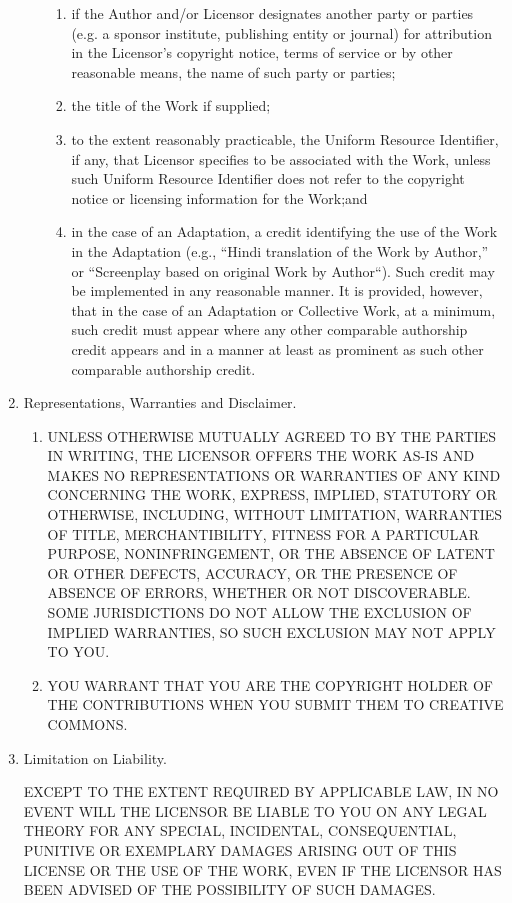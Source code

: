 \begin{enumerate}
\begin{enumerate}
\begin{enumerate}
	      \item{if the Author and/or Licensor designates another party or parties (e.g. a sponsor institute, publishing entity or journal) for attribution in the Licensor's copyright notice, terms of service or by other reasonable means, the name of such party or parties;}
	      \item{the title of the Work if supplied;}
	      \item{to the extent reasonably practicable, the Uniform Resource Identifier, if any, that Licensor specifies to be associated with the Work, unless such Uniform Resource Identifier does not refer to the copyright notice or licensing information for the Work;and}
	      \item{in the case of an Adaptation, a credit identifying the use of the Work in the Adaptation (e.g., ``Hindi translation of the Work by Author,'' or ``Screenplay based on original Work by Author``). Such credit may be implemented in any reasonable manner. It is provided, however, that in the case of an Adaptation or Collective Work, at a minimum, such credit must appear where any other comparable authorship credit appears and in a manner at least as prominent as such other comparable authorship credit.}
	    \end{enumerate}
      \end{enumerate}

    \item{Representations, Warranties and Disclaimer.}
	\begin{enumerate}
	  \item {UNLESS OTHERWISE MUTUALLY AGREED TO BY THE PARTIES IN WRITING, THE LICENSOR OFFERS THE WORK AS-IS AND MAKES NO REPRESENTATIONS OR WARRANTIES OF ANY KIND CONCERNING THE WORK, EXPRESS, IMPLIED, STATUTORY OR OTHERWISE, INCLUDING, WITHOUT LIMITATION, WARRANTIES OF TITLE, MERCHANTIBILITY, FITNESS FOR A PARTICULAR PURPOSE, NONINFRINGEMENT, OR THE ABSENCE OF LATENT OR OTHER DEFECTS, ACCURACY, OR THE PRESENCE OF ABSENCE OF ERRORS, WHETHER OR NOT DISCOVERABLE. SOME JURISDICTIONS DO NOT ALLOW THE EXCLUSION OF IMPLIED WARRANTIES, SO SUCH EXCLUSION MAY NOT APPLY TO YOU.}
	  \item{YOU WARRANT THAT YOU ARE THE COPYRIGHT HOLDER OF THE CONTRIBUTIONS WHEN YOU SUBMIT THEM TO CREATIVE COMMONS.}
	\end{enumerate}
    
    \item{Limitation on Liability.}
  
    EXCEPT TO THE EXTENT REQUIRED BY APPLICABLE LAW, IN NO EVENT WILL THE LICENSOR BE LIABLE TO YOU ON ANY LEGAL THEORY FOR ANY SPECIAL, INCIDENTAL, CONSEQUENTIAL, PUNITIVE OR EXEMPLARY DAMAGES ARISING OUT OF THIS LICENSE OR THE USE OF THE WORK, EVEN IF THE LICENSOR HAS BEEN ADVISED OF THE POSSIBILITY OF SUCH DAMAGES.
  

\end{enumerate}
